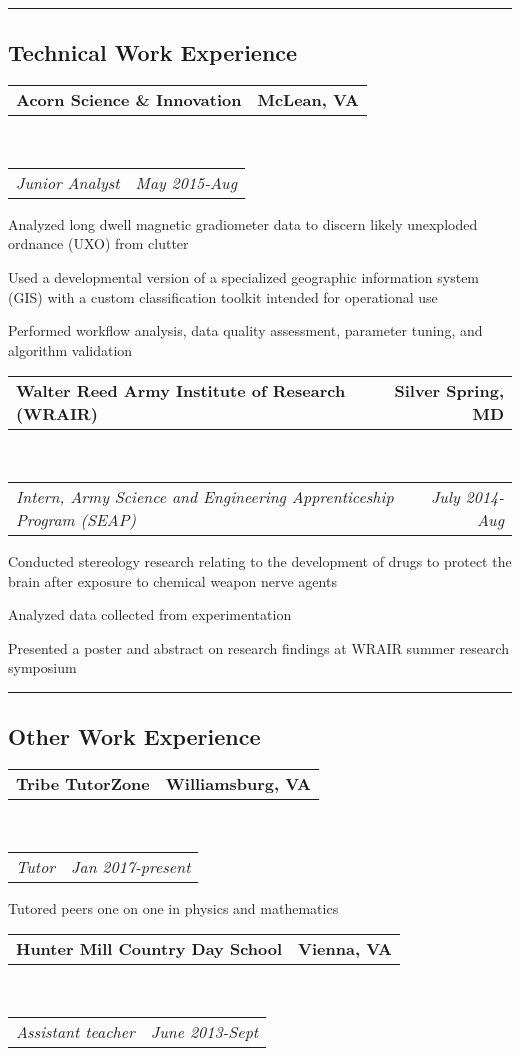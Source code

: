 \documentclass[10pt,letterpaper]{article}
\makeatletter
\newcommand{\headerrow}[2]
{\begin{tabular*}{\linewidth}{l@{\extracolsep{\fill}}r}
	#1 &
	#2 \\
\end{tabular*}}
\makeatother
\begin{document}
\hrule
\vspace{-0.4em}
\subsection*{Technical Work Experience}

	\headerrow
		{\textbf{Acorn Science \& Innovation}}
		{\textbf{McLean, VA}}
	\\
	\headerrow
		{\emph{Junior Analyst}}
		{\emph{May 2015-Aug}}
	\begin{itemize*}
		\item Analyzed long dwell magnetic gradiometer data to
			discern likely unexploded ordnance (UXO) from clutter
		\item Used a developmental version of a specialized geographic information system (GIS) with 			a custom classification toolkit intended for operational use
		\item Performed workflow analysis, data
quality assessment, parameter tuning, and algorithm validation
	\end{itemize*}
	\headerrow
		{\textbf{Walter Reed Army Institute of Research (WRAIR)}}
		{\textbf{Silver Spring, MD}}
	\\
	\headerrow
		{\emph{Intern, Army Science and Engineering Apprenticeship Program (SEAP)}}
		{\emph{July 2014-Aug}}
	\begin{itemize*}
		\item Conducted stereology research relating to the development of drugs to protect the brain after exposure to chemical weapon nerve agents
		\item Analyzed data collected from experimentation
		\item Presented a poster and abstract on research findings at WRAIR summer research symposium
	\end{itemize*}
	
\hrule
\vspace{-0.4em}
\subsection*{Other Work Experience}

	\headerrow
		{\textbf{Tribe TutorZone}}
		{\textbf{Williamsburg, VA}}
	\\
	\headerrow
		{\emph{Tutor}}
		{\emph{Jan 2017-present}}
	\begin{itemize*}
		\item Tutored peers one on one in physics and mathematics
	\end{itemize*}
	\headerrow
		{\textbf{Hunter Mill Country Day School}}
		{\textbf{Vienna, VA}}
	\\
	\headerrow
		{\emph{Assistant teacher}}
		{\emph{June 2013-Sept}}
	
\end{document}
